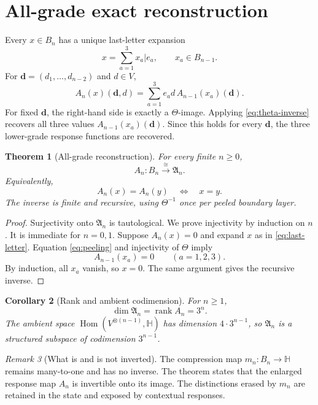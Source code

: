 \documentclass[11pt]{article}
\newtheorem{theorem}{Theorem}[section]
\newtheorem{corollary}[theorem]{Corollary}
\theoremstyle{definition}
\theoremstyle{remark}
\newtheorem{remark}[theorem]{Remark}
\newcommand{\Hq}{\mathbb H}
\newcommand{\Aresp}{\mathfrak A}
\newcommand{\Hom}{\operatorname{Hom}}
\begin{document}
\section{All-grade exact reconstruction}\label{sec:reconstruction}

Every $x\in B_n$ has a unique last-letter expansion
\begin{equation}\label{eq:last-letter}
  x=\sum_{a=1}^3 x_a|e_a,
  \qquad x_a\in B_{n-1}.
\end{equation}
For $\mathbf d=(d_1,\ldots,d_{n-2})$ and $d\in V$,
\begin{equation}\label{eq:peeling}
  A_n(x)(\mathbf d,d)
  =\sum_{a=1}^3 e_a d\,A_{n-1}(x_a)(\mathbf d).
\end{equation}
For fixed $\mathbf d$, the right-hand side is exactly a $\Theta$-image.  Applying \eqref{eq:theta-inverse} recovers all three values $A_{n-1}(x_a)(\mathbf d)$.  Since this holds for every $\mathbf d$, the three lower-grade response functions are recovered.

\begin{theorem}[All-grade reconstruction]\label{thm:all-grade}
For every finite $n\ge0$,
\[
  A_n:B_n\xrightarrow{\cong}\Aresp_n.
\]
Equivalently,
\[
  A_n(x)=A_n(y)\quad\Longleftrightarrow\quad x=y.
\]
The inverse is finite and recursive, using $\Theta^{-1}$ once per peeled boundary layer.
\end{theorem}

\begin{proof}
Surjectivity onto $\Aresp_n$ is tautological.  We prove injectivity by induction on $n$.  It is immediate for $n=0,1$.  Suppose $A_n(x)=0$ and expand $x$ as in \eqref{eq:last-letter}.  Equation \eqref{eq:peeling} and injectivity of $\Theta$ imply
\[
  A_{n-1}(x_a)=0\qquad(a=1,2,3).
\]
By induction, all $x_a$ vanish, so $x=0$.  The same argument gives the recursive inverse.
\end{proof}

\begin{corollary}[Rank and ambient codimension]
For $n\ge1$,
\[
  \dim\Aresp_n=\operatorname{rank}A_n=3^n.
\]
The ambient space $\Hom(V^{\otimes(n-1)},\Hq)$ has dimension $4\cdot3^{n-1}$, so $\Aresp_n$ is a structured subspace of codimension $3^{n-1}$.
\end{corollary}

\begin{remark}[What is and is not inverted]
The compression map $m_n:B_n\to\Hq$ remains many-to-one and has no inverse.  The theorem states that the enlarged response map $A_n$ is invertible onto its image.  The distinctions erased by $m_n$ are retained in the state and exposed by contextual responses.
\end{remark}
\end{document}
